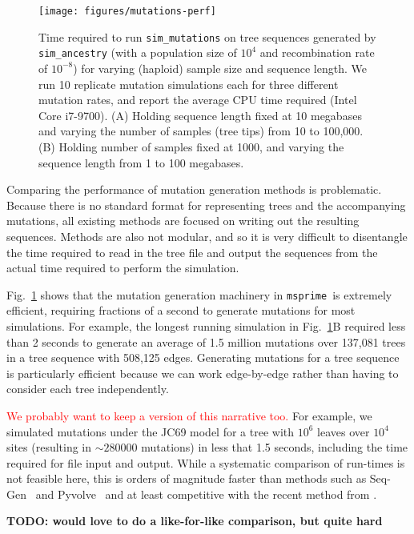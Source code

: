 \documentclass{article}
\newcommand{\msprime}[0]{\texttt{msprime}}
\newcommand{\jkcomment}[1]{\textcolor{red}{#1}}
\begin{document}
\begin{figure}
\texttt{[image: figures/mutations-perf]}
\caption{\label{fig-mutations-perf} Time required to run
\texttt{sim\_mutations} on tree sequences generated
by \texttt{sim\_ancestry} (with a population size of $10^4$
and recombination rate of $10^{-8}$) for varying (haploid) sample
size and sequence length. We run 10 replicate mutation simulations
each for three different mutation rates, and report the average
CPU time required (Intel Core i7-9700).
(A) Holding sequence length fixed at 10 megabases and varying the
number of samples (tree tips) from 10 to 100,000.
(B) Holding number of samples fixed at 1000, and varying the sequence
length from 1 to 100 megabases.}
\end{figure}

Comparing the performance of mutation generation methods is problematic.
Because there is no standard format for representing trees and
the accompanying mutations, all existing methods are focused on
writing out the resulting sequences. Methods are also not modular,
and so it is very difficult to disentangle the time required to
read in the tree file and output the sequences from the actual
time required to perform the simulation.

Fig.~\ref{fig-mutations-perf} shows that the mutation generation
machinery in \msprime\ is extremely efficient, requiring
fractions of a second to generate mutations for most simulations.
For example, the longest running simulation in
Fig.~\ref{fig-mutations-perf}B required less than 2 seconds to
generate an average of 1.5 million mutations over 137,081 trees
in a tree sequence with 508,125 edges.
Generating mutations for a tree sequence is particularly efficient
because we can work edge-by-edge rather than having to
consider each tree independently.

\jkcomment{We probably want to keep a version of this narrative too.}
For example, we simulated mutations under the JC69
model for a tree with $10^6$ leaves over $10^4$ sites (resulting
in $\sim 280000$ mutations) in less that 1.5 seconds, including
the time required for file input and output. While a systematic
comparison of run-times is not feasible here, this is orders
of magnitude faster than methods such as
Seq-Gen~\citep{rambaut1997seq} and
Pyvolve~\citep{spielman2015pyvolve}
and at least competitive with the recent method from
\cite{demaio2021phastsim}.

\textbf{TODO: would love to do a like-for-like comparison, but quite hard}
\end{document}
